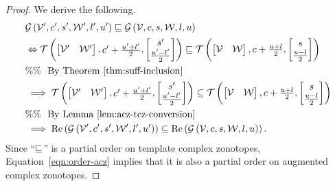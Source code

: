 %
\begin{proof}
  We derive the following.
  \begin{align*}
&    \mathcal{G}\left(\mathcal{V}^\prime,c^\prime,s^\prime,\mathcal{W}^\prime,l^\prime,u^\prime\right)\sqsubseteq\mathcal{G}\left(\mathcal{V},c,s,\mathcal{W},l,u\right)\\
& \Leftrightarrow   \mathit{\operatorname{\mathcal{T}}}\left(\left[\begin{matrix}
      \mathcal{V}^\prime &
      \mathcal{W}^\prime
    \end{matrix}\right]
  ,\begin{matrix}
      c^\prime+\frac{u^\prime+l^\prime}{2}
    \end{matrix}
  ,\left[\begin{matrix}
      s^\prime\\
      \frac{u^\prime-l^\prime}{2}
    \end{matrix}\right]
  \right)  
  \sqsubseteq
  \mathit{\operatorname{\mathcal{T}}}\left(\left[\begin{matrix}
      \mathcal{V} &
      \mathcal{W}
    \end{matrix}\right]
  ,\begin{matrix}
      c+\frac{u+l}{2}
    \end{matrix}
  ,\left[\begin{matrix}
      s\\
      \frac{u-l}{2}
    \end{matrix}\right]
  \right)\\
  & \%\%~~\text{By Theorem~\ref{thm:suff-inclusion}}\\
  & \implies
  \mathit{\operatorname{\mathcal{T}}}\left(\left[\begin{matrix}
      \mathcal{V}^\prime &
      \mathcal{W}^\prime
    \end{matrix}\right]
  ,\begin{matrix}
      c^\prime+\frac{u^\prime+l^\prime}{2}
    \end{matrix}
  ,\left[\begin{matrix}
      s^\prime\\
      \frac{u^\prime-l^\prime}{2}
    \end{matrix}\right]
  \right)  
  \subseteq
  \mathit{\operatorname{\mathcal{T}}}\left(\left[\begin{matrix}
      \mathcal{V} &
      \mathcal{W}
    \end{matrix}\right]
  ,\begin{matrix}
      c+\frac{u+l}{2}
    \end{matrix}
  ,\left[\begin{matrix}
      s\\
      \frac{u-l}{2}
    \end{matrix}\right]
  \right)\\
  & \%\%~~\text{By Lemma~\ref{lem:acz-tcz-conversion}}\\
&\implies
  \operatorname{Re}\left(\mathcal{G}\left(\mathcal{V}^\prime,c^\prime,s^\prime,\mathcal{W}^\prime,l^\prime,u^\prime\right)\right)\subseteq\operatorname{Re}\left(\mathcal{G}\left(\mathcal{V},c,s,\mathcal{W},l,u\right)\right).
  \end{align*}
Since ``$\sqsubseteq$'' is a partial order on template complex zonotopes,
Equation~\ref{eqn:order-acz} implies that it is also a partial order on augmented
complex zonotopes.
\end{proof}
